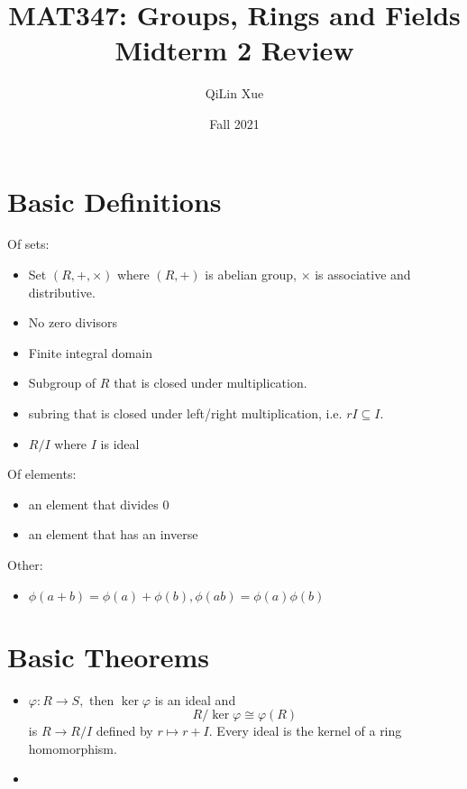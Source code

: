 \documentclass{article}
\title{MAT347: Groups, Rings and Fields \\ Midterm 2 Review}
\author{QiLin Xue}
\date{Fall 2021}
\numberwithin{equation}{section}
\begin{document}
\maketitle
\tableofcontents
\newpage
\section{Basic Definitions}
Of sets:
\begin{itemize}
    \item {} Set $(R,+,\times)$ where $(R,+)$ is abelian group, $\times$ is associative and distributive.
    \item {} No zero divisors
    \item {} Finite integral domain
    \item {} Subgroup of $R$ that is closed under multiplication.
    \item {} subring that is closed under left/right multiplication, i.e. $rI \subseteq I.$
    \item {} $R/I$ where $I$ is ideal
\end{itemize}
Of elements:
\begin{itemize}
    \item {} an element that divides $0$
    \item {} an element that has an inverse
\end{itemize}
Other:
\begin{itemize}
    \item {} $\phi(a+b)=\phi(a)+\phi(b),\phi(ab)=\phi(a)\phi(b)$
\end{itemize}
\section{Basic Theorems}
\begin{itemize}
    \item {} $\varphi:R\to S,$ then $\ker \varphi$ is an ideal and 
    \begin{equation}
        R/\ker\varphi \cong \varphi(R)
    \end{equation}
     is $R\to R/I$ defined by $r\mapsto r + I.$ Every ideal is the kernel of a ring homomorphism.
    \item \emf{}
\end{itemize}
\end{document}
